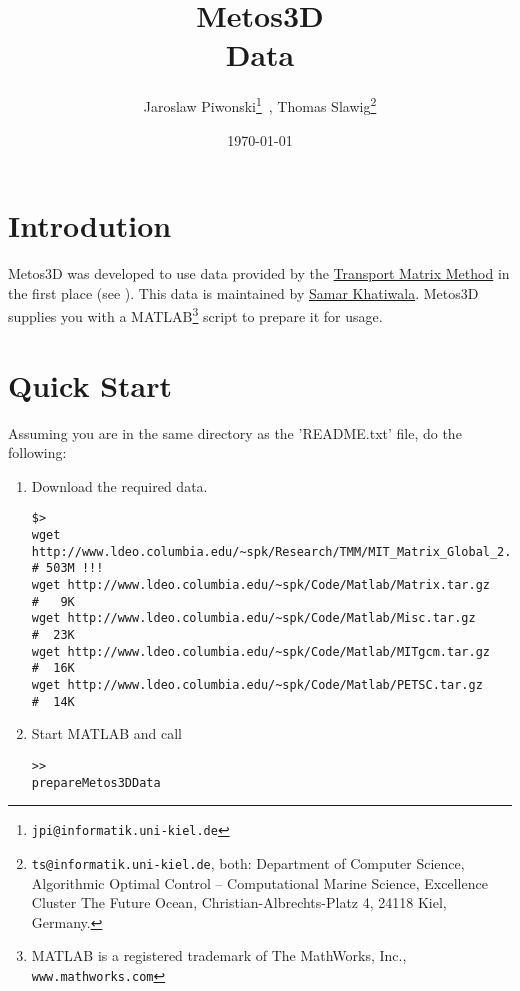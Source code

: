 \documentclass{article}
\begin{document}
%
%
\title{
Metos3D \\
\bigskip
Data
}
\author{
Jaroslaw Piwonski\thanks{\texttt{jpi@informatik.uni-kiel.de}} \,,
Thomas Slawig\thanks{\texttt{ts@informatik.uni-kiel.de},
both: Department of Computer Science, Algorithmic Optimal Control -- Computational Marine Science,
Excellence Cluster The Future Ocean, Christian-Albrechts-Platz 4, 24118 Kiel, Germany.}
}
\date{\today}
\maketitle

%
%
\section{Introdution}

Metos3D was developed to use data provided by the
\href{http://www.ldeo.columbia.edu/~spk/Research/TMM/tmm.html}{Transport Matrix Method}
in the first place (see \cite{KhViCa05}).
%
This data is maintained by
\href{http://www.ldeo.columbia.edu/~spk/}{Samar Khatiwala}.
%
Metos3D supplies you with a
MATLAB\footnote{MATLAB is a registered trademark of The MathWorks, Inc., 
\texttt{www.mathworks.com}}
script to prepare it for usage.

%
%
\section{Quick Start}

Assuming you are in the same directory as the 'README.txt' file, do the following:

\begin{enumerate}
\item Download the required data.
\begin{verbatim}
$>
wget http://www.ldeo.columbia.edu/~spk/Research/TMM/MIT_Matrix_Global_2.8deg.tar.gz  # 503M !!! 
wget http://www.ldeo.columbia.edu/~spk/Code/Matlab/Matrix.tar.gz                     #   9K
wget http://www.ldeo.columbia.edu/~spk/Code/Matlab/Misc.tar.gz                       #  23K
wget http://www.ldeo.columbia.edu/~spk/Code/Matlab/MITgcm.tar.gz                     #  16K
wget http://www.ldeo.columbia.edu/~spk/Code/Matlab/PETSC.tar.gz                      #  14K
\end{verbatim}
\item Start MATLAB and call
\begin{verbatim}
>>
prepareMetos3DData
\end{verbatim}
\end{enumerate}
\end{document}
